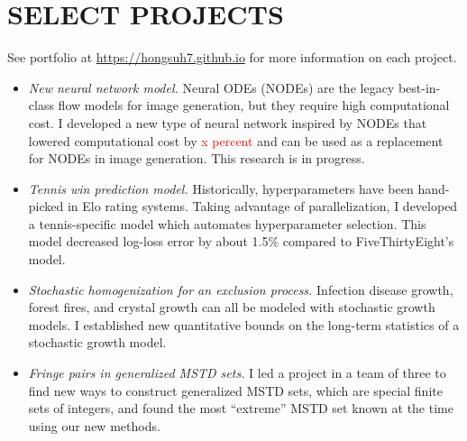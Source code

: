 \documentclass{simplecv}
\begin{document}
\section{SELECT PROJECTS}
See portfolio at \url{https://hongsuh7.github.io} for more information on each project.
\begin{itemize}
  \item {\it New neural network model.} Neural ODEs (NODEs) are the legacy best-in-class flow models for image generation, but they require high computational cost. I developed a new type of neural network inspired by NODEs that lowered computational cost by \textcolor{red}{x percent} and can be used as a replacement for NODEs in image generation. This research is in progress.%
  \item {\it Tennis win prediction model.} Historically, hyperparameters have been hand-picked in Elo rating systems. Taking advantage of parallelization, I developed a tennis-specific model which automates hyperparameter selection. This model decreased log-loss error by about 1.5\% compared to FiveThirtyEight's model. %
  \item {\it Stochastic homogenization for an exclusion process.} Infection disease growth, forest fires, and crystal growth can all be modeled with stochastic growth models. I established new quantitative bounds on the long-term statistics of a stochastic growth model. 
  \item {\it Fringe pairs in generalized MSTD sets.} I led a project in a team of three to find new ways to construct generalized MSTD sets, which are special finite sets of integers, and found the most ``extreme'' MSTD set known at the time using our new methods. 
\end{itemize}
\end{document}
